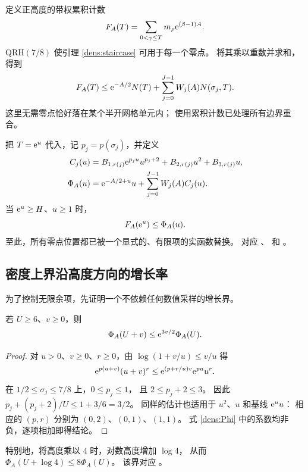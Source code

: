 定义正高度的带权累积计数
\[
 F_A(T)=\sum_{0<\gamma\leq T}m_\rho\mathrm e^{(\beta-1)A}.
\]
QRH$(7/8)$ 使引理 \ref{dens:staircase} 可用于每一个零点。
将其乘以重数并求和，得到
\begin{equation}\label{dens:weighted-count}
 F_A(T)\leq\mathrm e^{-A/2}N(T)+
              \sum_{j=0}^{J-1}W_j(A)N(\sigma_j,T).
\end{equation}
这里无需零点恰好落在某个半开网格单元内；
使用累积计数已处理所有边界重合。

把 $T=\mathrm e^u$ 代入，记 $p_j=p(\sigma_j)$，并定义
\begin{align}
 C_j(u)&=
 B_{1,r(j)}\mathrm e^{p_ju}u^{p_j+2}
       +B_{2,r(j)}u^2+B_{3,r(j)}u,\label{dens:C}\\
 \Phi_A(u)&=\mathrm e^{-A/2+u}u+
                     \sum_{j=0}^{J-1}W_j(A)C_j(u).
                                                   \label{dens:Phi}
\end{align}
当 $\mathrm e^u\geq H$、$u\geq1$ 时，
\begin{equation}\label{dens:F-Phi}
 F_A(\mathrm e^u)\leq\Phi_A(u).
\end{equation}
至此，所有零点位置都已被一个显式的、有限项的实函数替换。
对应 、
和 。

\subsection{密度上界沿高度方向的增长率}

为了控制无限余项，先证明一个不依赖任何数值采样的增长界。
\begin{lemma}\label{dens:growth}
若 $U\geq6$、$v\geq0$，则
\begin{equation}\label{dens:growth-eq}
 \Phi_A(U+v)\leq\mathrm e^{3v/2}\Phi_A(U).
\end{equation}
\end{lemma}
\begin{proof}
对 $u>0$、$v\geq0$、$r\geq0$，由
$\log(1+v/u)\leq v/u$ 得
\[
 \mathrm e^{p(u+v)}(u+v)^r
 \leq \mathrm e^{(p+r/u)v}\mathrm e^{pu}u^r.
\]
在 $1/2\leq\sigma_j\leq7/8$ 上，$0\leq p_j\leq1$，
且 $2\leq p_j+2\leq3$。
因此 $p_j+(p_j+2)/U\leq1+3/6=3/2$。
同样的估计也适用于 $u^2$、$u$ 和基线 $\mathrm e^u u$：
相应的 $(p,r)$ 分别为 $(0,2)$、$(0,1)$、$(1,1)$。
式 \eqref{dens:Phi} 中的系数均非负，逐项相加即得结论。
\end{proof}
特别地，将高度乘以 $4$ 时，对数高度增加 $\log4$，
从而 $\Phi_A(U+\log4)\leq8\Phi_A(U)$。
该界对应 。

